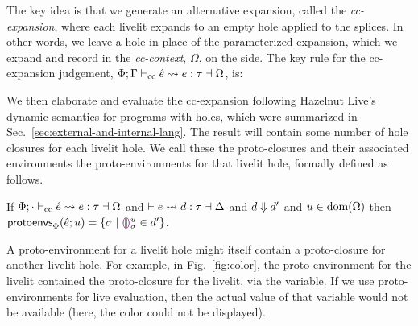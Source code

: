 The key idea is that we generate an alternative expansion,
called the \emph{cc-expansion},
where each livelit expands to an empty hole applied to the splices. In other words,
we leave a hole in place of the parameterized expansion, which we expand and record in the \emph{cc-context}, $\Omega$, on the side.
The key rule for the cc-expansion judgement, $\ccexpands{\Phi}{\Gamma}{\hat e}{e}{\tau}{\Omega}$, is:
\begin{mathpar}
\end{mathpar}

We then elaborate and evaluate the cc-expansion
following Hazelnut Live's dynamic semantics for programs with holes, which were summarized
in Sec.~\ref{sec:external-and-internal-lang}. The result will contain some number of hole closures
for each livelit hole. We call these the proto-closures and their associated environments the proto-environments for that livelit hole, formally defined as follows.
\begin{definition}
If $\ccexpands{\Phi}{\cdot}{\hat e}{e}{\tau}{\Omega}$ and $\elabs{}{e}{d}{\tau}{\Delta}$
and $\evalsTo{d}{d'}$ and $u \in \domof{\Omega}$ then $\protoEnvsOf{\Phi}{\hat e}{u} = \{ \sigma \mid \dehole{u}{\sigma} \in d' \}$.
\end{definition}
A proto-environment for a livelit hole might itself contain a proto-closure for another livelit hole.
For example, in Fig.~\ref{fig:color}, the proto-environment for the  livelit contained the
proto-closure for the  livelit, via the  variable.
If we use proto-environments for live evaluation, then the actual value of that variable
would not be available (here, the color could not be displayed).

